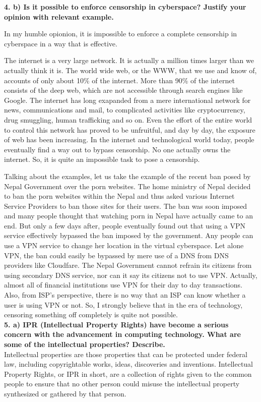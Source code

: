\documentclass [12pt, a4paper]{article}
\begin{document}
\large
\textbf{4. b) Is it possible to enforce censorship in cyberspace? Justify your opinion with relevant example.}\\
\normalsize
\par
In my humble opionion, it is impossible to enforce a complete censorship in cyberspace in a way that is effective.\\
\par
The internet is a very large network. It is actually a million times larger than we actually think it is. The world wide web, or the WWW, that we use and know of, accounts of only about 10\% of the internet. More than 90\% of the internet consists of the deep web, which are not accessible through search engines like Google. The internet has long exapanded from a mere international network for news, communications and mail, to complicated activities like cryptocurrency, drug smuggling, human trafficking and so on. Even the effort of the entire world to control this network has proved to be unfruitful, and day by day, the exposure of web has been increasing. In the internet and technological world today, people eventually find a way out to bypass censorship. No one actually owns the internet. So, it is quite an impossible task to pose a censorship.\\
\par
Talking about the examples, let us take the example of the recent ban posed by Nepal Government over the porn websites. The home ministry of Nepal decided to ban the porn websites within the Nepal and thus asked various Internet Service Providers to ban those sites for their users. The ban was soon imposed and many people thought that watching porn in Nepal have actually came to an end. But only a few days after, people eventually found out that using a VPN service effectively bypassed the ban imposed by the government. Any people can use a VPN service to change her location in the virtual cyberspace. Let alone VPN, the ban could easily be bypassed by mere use of a DNS from DNS providers like Cloudfare. The Nepal Government cannot refrain its citizens from using secondary DNS service, nor can it say its citizens not to use VPN. Actually, almost all of financial institutions use VPN for their day to day transactions. Also, from ISP's perspective, there is no way that an ISP can know whether a user is using VPN or not. So, I strongly believe that in the era of technology, censoring something off completely is quite not possible.\\

\large
\textbf{5. a) IPR (Intellectual Property Rights) have become a serious concern with the advancement in computing technology. What are some of the intellectual properties? Describe.}\\
\normalsize
Intellectual properties are those properties that can be protected under federal law, including copyrightable works, ideas, discoveries and inventions. Intellectual Property Rights, or IPR in short, are a collection of rights given to the common people to ensure that no other person could misuse the intellectual property synthesized or gathered by that person.
\end{document}
